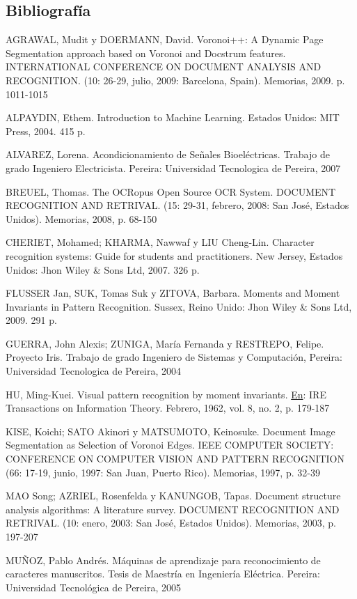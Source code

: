 \documentclass[a4paper, 11pt, oneside]{article}
\begin{document}
	\begin{center}
	\section{Bibliografía}
	\end{center}
AGRAWAL, Mudit y DOERMANN, David. Voronoi++: A Dynamic Page Segmentation approach based on Voronoi and Docstrum features. INTERNATIONAL CONFERENCE ON DOCUMENT ANALYSIS AND RECOGNITION. (10: 26-29, julio, 2009: Barcelona, Spain). Memorias, 2009. p. 1011-1015

ALPAYDIN, Ethem. Introduction to Machine Learning. Estados Unidos: MIT Press, 2004. 415 p.

ALVAREZ, Lorena. Acondicionamiento de Señales Bioeléctricas. Trabajo de grado Ingeniero Electricista. Pereira: Universidad Tecnologica de Pereira, 2007

BREUEL, Thomas. The OCRopus Open Source OCR System. DOCUMENT RECOGNITION AND RETRIVAL. (15: 29-31, febrero, 2008: San José, Estados Unidos). Memorias, 2008, p. 68-150

CHERIET, Mohamed; KHARMA, Nawwaf y LIU Cheng-Lin. Character recognition systems: Guide for students and practitioners. New Jersey, Estados Unidos: Jhon Wiley \& Sons Ltd, 2007. 326 p.

FLUSSER Jan, SUK, Tomas Suk y ZITOVA, Barbara. Moments and Moment Invariants in Pattern Recognition. Sussex, Reino Unido: Jhon Wiley \& Sons Ltd, 2009. 291 p.

GUERRA, John Alexis; ZUNIGA, María Fernanda y RESTREPO, Felipe. Proyecto Iris. Trabajo de grado Ingeniero de Sistemas y Computación, Pereira: Universidad Tecnologica de Pereira, 2004

HU, Ming-Kuei. Visual pattern recognition by moment invariants. \underline{En}: IRE Transactions on Information Theory. Febrero, 1962, vol. 8, no. 2, p. 179-187

KISE, Koichi; SATO Akinori y MATSUMOTO, Keinosuke. Document Image Segmentation as Selection of Voronoi Edges. IEEE COMPUTER SOCIETY: CONFERENCE ON COMPUTER VISION AND PATTERN RECOGNITION (66: 17-19, junio, 1997: San Juan, Puerto Rico). Memorias, 1997, p. 32-39

MAO Song; AZRIEL, Rosenfelda y KANUNGOB, Tapas. Document structure analysis algorithms: A literature survey. DOCUMENT RECOGNITION AND RETRIVAL. (10: enero, 2003: San José, Estados Unidos). Memorias, 2003, p. 197-207

MUÑOZ, Pablo Andrés. Máquinas de aprendizaje para reconocimiento de caracteres manuscritos. Tesis de Maestría en Ingeniería Eléctrica. Pereira: Universidad Tecnológica de Pereira, 2005
\end{document}
